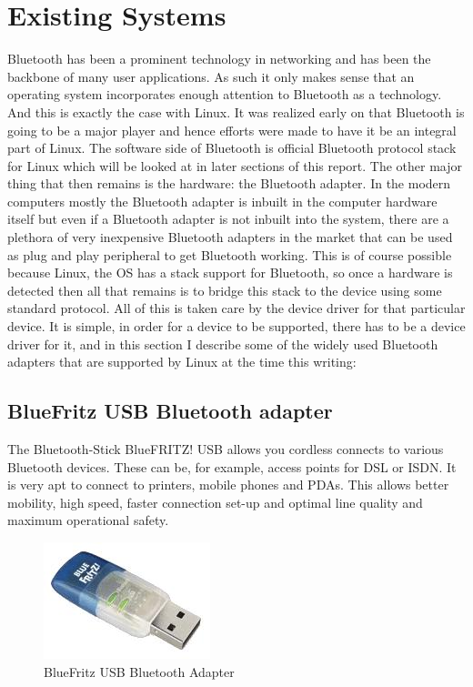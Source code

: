 \section{Existing Systems}
Bluetooth has been a prominent technology in networking and has been the backbone of many user applications. As such it only makes sense that an operating system incorporates enough attention to Bluetooth as a technology. And this is exactly the case with Linux. It was realized early on that Bluetooth is going to be a major player and hence efforts were made to have it be an integral part of Linux. The software side of Bluetooth is official Bluetooth protocol stack for Linux which will be looked at in later sections of this report. The other major thing that then remains is the hardware: the Bluetooth adapter. In the modern computers mostly the Bluetooth adapter is inbuilt in the computer hardware itself but even if a Bluetooth adapter is not inbuilt into the system, there are a plethora of very inexpensive Bluetooth adapters in the market that can be used as plug and play peripheral to get Bluetooth working. This is of course possible because Linux, the OS has a stack support for Bluetooth, so once a hardware is detected then all that remains is to bridge this stack to the device using some standard protocol. All of this is taken care by the device driver for that particular device. It is simple, in order for a device to be supported, there has to be a device driver for it, and in this section I describe some of the widely used Bluetooth adapters that are supported by Linux at the time this writing:
\subsection{BlueFritz USB Bluetooth adapter}
The Bluetooth-Stick BlueFRITZ! USB allows you cordless connects to various Bluetooth devices. These can be, for example, access points for DSL or ISDN. It is very apt to connect to printers, mobile phones and PDAs. This allows better mobility, high speed, faster connection set-up and optimal line quality and maximum operational safety.
\begin{figure}[ht]
	\centering
	\includegraphics[scale=0.5]{images/bluefritz_usb.png}
	\caption{BlueFritz USB Bluetooth Adapter}
\end{figure}
